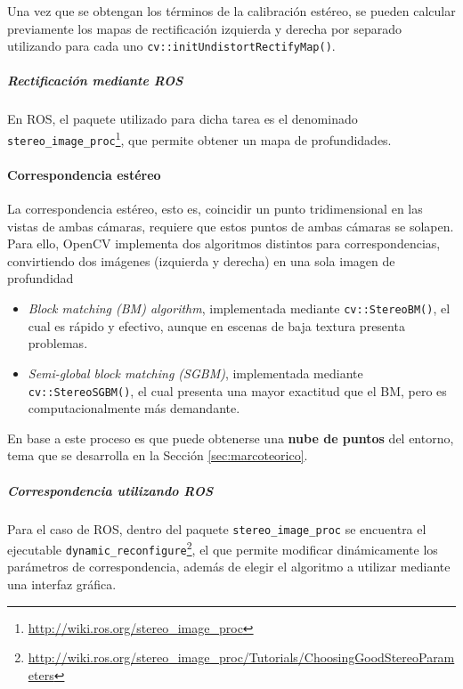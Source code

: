 Una vez que se obtengan los términos de la calibración estéreo, se pueden calcular previamente los mapas de rectificación izquierda y derecha por separado utilizando para cada uno \texttt{cv::initUndistortRectifyMap()}. 




\subparagraph{Rectificación mediante ROS}
En ROS, el paquete utilizado para dicha tarea es el denominado \texttt{stereo\_image\_proc}\footnote{\url{http://wiki.ros.org/stereo_image_proc}}, que permite obtener un mapa de profundidades.

\paragraph{Correspondencia estéreo}
La correspondencia estéreo, esto es, coincidir un punto tridimensional en las vistas de ambas cámaras, requiere que estos puntos de ambas cámaras se solapen. Para ello, OpenCV implementa dos algoritmos distintos para correspondencias, convirtiendo dos imágenes (izquierda y derecha) en una sola imagen de profundidad
\begin{itemize}
    \item \textit{Block matching (BM) algorithm}, implementada mediante \texttt{cv::StereoBM()}, el cual es rápido y efectivo, aunque en escenas de baja textura presenta problemas. 
    \item \textit{Semi-global block matching (SGBM)}, implementada mediante \texttt{cv::StereoSGBM()}, el cual presenta una mayor exactitud que el BM, pero es computacionalmente más demandante.
\end{itemize}

En base a este proceso es que puede obtenerse una \textbf{nube de puntos} del entorno, tema que se desarrolla en la Sección \ref{sec:marcoteorico}.
\subparagraph{Correspondencia utilizando ROS}
Para el caso de ROS, dentro del paquete \texttt{stereo\_image\_proc} se encuentra el ejecutable \texttt{dynamic\_reconfigure}\footnote{\url{http://wiki.ros.org/stereo_image_proc/Tutorials/ChoosingGoodStereoParameters}}, el que permite modificar dinámicamente los parámetros de correspondencia, además de elegir el algoritmo a utilizar mediante una interfaz gráfica.

